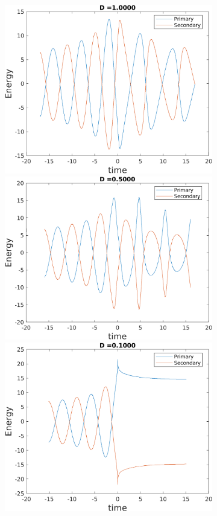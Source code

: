 \documentclass[a4paper]{article}
\begin{document}
\begin{enumerate} [label*=\textbf{(\alph*)}]
				\begin{figure} [h]
					\centering
					\begin{subfigure} {.425\linewidth}
						\includegraphics[width=\linewidth, height =.55\linewidth] {../plots/3f/retrograde_energies/6.png}\\
						\vspace{1.5mm}
						\includegraphics[width=\linewidth, height =.55\linewidth] {../plots/3f/retrograde_energies/5.png}\\
						\vspace{1.5mm}
						\includegraphics[width=\linewidth, height =.55\linewidth] {../plots/3f/retrograde_energies/4.png}\\

\end{subfigure}
\end{figure}
\end{enumerate}
\end{document}
